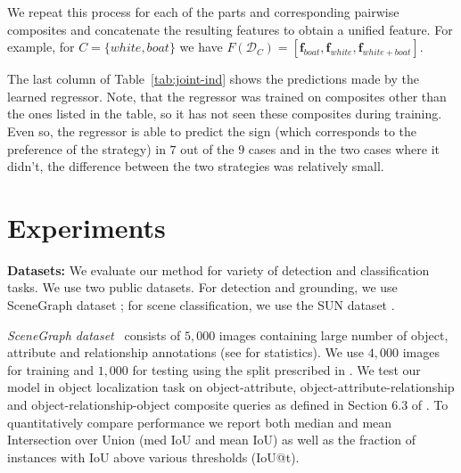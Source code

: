 \documentclass[runningheads]{llncs}
\newcommand{\RevComment} [1]{{\color{Red}{#1}}}
\begin{document}
We repeat this process for each of the parts and corresponding pairwise composites and concatenate the resulting features to obtain a unified feature. For example, for $C=\{white,boat\}$ we have $F(\mathcal{D}_C) = [\mathbf f_{boat},\mathbf f_{white},\mathbf f_{white+boat}]$. 

The last column of Table~\ref{tab:joint-ind} shows the predictions made by the learned regressor. Note, that the regressor was trained on composites other than the ones listed in the table, so it has not seen these composites during training. Even so, the regressor is able to predict the sign (which corresponds to the preference of the strategy) in $7$ out of the $9$ cases and in the two cases where it didn't, the difference between the two strategies was relatively small. 

\vspace{-0.05in}
\section{Experiments}
%
%
\vspace{-0.05in}
\noindent
{\bf Datasets:} We evaluate our method for variety of detection and classification tasks. We use two public datasets. For detection and grounding, we use SceneGraph dataset  \cite{Johnson2015}; for scene classification, we use the SUN dataset \cite{patterson2014sun}. 


{\em SceneGraph dataset}~\cite{Johnson2015}
consists of $5,000$ images containing large number of object, attribute and relationship annotations (see \cite{Johnson2015} for statistics).
We use $4,000$ images for training and $1,000$ for testing using the split prescribed in \cite{Johnson2015}. We test our model in object localization task on object-attribute, object-attribute-relationship and object-relationship-object composite queries as defined in Section 6.3 of \cite{Johnson2015}. To quantitatively compare performance we report both median and mean Intersection over Union (med IoU and mean IoU) as well as the fraction of instances with IoU above various thresholds (IoU@t). 
\end{document}
